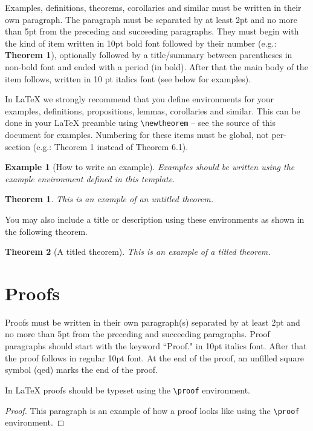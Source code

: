 \documentclass{article}
\newtheorem{example}{Example}
\newtheorem{theorem}{Theorem}
\begin{document}
Examples, definitions, theorems, corollaries and similar must be written in their own paragraph. The paragraph must be separated by at least 2pt and no more than 5pt from the preceding and succeeding paragraphs. They must begin with the kind of item written in 10pt bold font followed by their number (e.g.: {\bf Theorem 1}),
optionally followed by a title/summary between parentheses in non-bold font and ended with a period (in bold).
After that the main body of the item follows, written in 10 pt italics font (see below for examples).

In \LaTeX{} we strongly recommend that you define environments for your examples, definitions, propositions, lemmas, corollaries and similar. This can be done in your \LaTeX{} preamble using \texttt{\textbackslash{newtheorem}} -- see the source of this document for examples. Numbering for these items must be global, not per-section (e.g.: Theorem 1 instead of Theorem 6.1).

\begin{example}[How to write an example]
    Examples should be written using the example environment defined in this template.
\end{example}

\begin{theorem}
    This is an example of an untitled theorem.
\end{theorem}

You may also include a title or description using these environments as shown in the following theorem.

\begin{theorem}[A titled theorem]
    This is an example of a titled theorem.
\end{theorem}

\section{Proofs}

Proofs must be written in their own paragraph(s) separated by at least 2pt and no more than 5pt from the preceding and succeeding paragraphs. Proof paragraphs should start with the keyword ``Proof." in 10pt italics font. After that the proof follows in regular 10pt font. At the end of the proof, an unfilled square symbol (qed) marks the end of the proof.

In \LaTeX{} proofs should be typeset using the \texttt{\textbackslash{proof}} environment.

\begin{proof}
    This paragraph is an example of how a proof looks like using the \texttt{\textbackslash{proof}} environment.
\end{proof}
\end{document}
